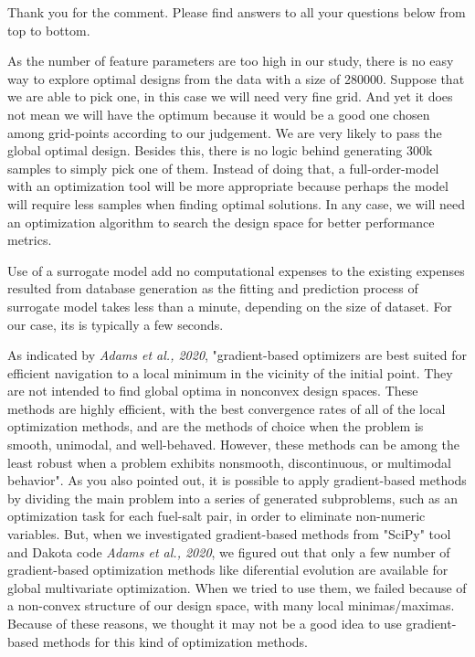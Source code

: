 \documentclass{ar2rc}
\begin{document}
    \Response Thank you for the comment. Please find answers to all your questions below from top to bottom.

    As the number of feature parameters are too high in our study, there is no easy way to explore optimal designs from the data with a size of 280000. Suppose that we are able to pick one, in this case we will need very fine grid. And yet it does not mean we will have the optimum because it would be a good one chosen among grid-points according to our judgement. We are very likely to pass the global optimal design. Besides this, there is no logic behind  generating 300k samples to simply pick one of them. Instead of doing that, a full-order-model with an optimization tool will be more appropriate because perhaps the model will require less samples when finding optimal solutions. In any case, we will need an optimization algorithm to search the design space for better performance metrics.

    Use of a surrogate model add no computational expenses to the existing expenses resulted from database generation as the fitting and prediction process of surrogate model takes less than a minute, depending on the size of dataset. For our case, its is typically a few seconds.

    As indicated by \textit{Adams et al., 2020}, "gradient-based optimizers are best suited for efficient navigation to a local minimum in the vicinity of the initial point. They are not intended to find global optima in nonconvex design spaces. These methods are highly efficient, with the best convergence rates of all of the local optimization methods, and are the methods of choice when the problem is smooth, unimodal, and well-behaved. However, these methods can be among the least robust when a problem exhibits nonsmooth, discontinuous, or multimodal behavior". As you also pointed out, it is possible to apply gradient-based methods by dividing the main problem into a series of generated subproblems, such as an optimization task for each fuel-salt pair, in order to eliminate non-numeric variables. But, when we investigated gradient-based methods from "SciPy" tool and Dakota code \textit{Adams et al., 2020}, we figured out that only a few number of gradient-based optimization methods like diferential evolution are available for global multivariate optimization. When we tried to use them, we failed because of a non-convex structure of our design space, with many local minimas/maximas. Because of these reasons, we thought it may not be a good idea to use gradient-based methods for this kind of optimization methods.
\end{document}
